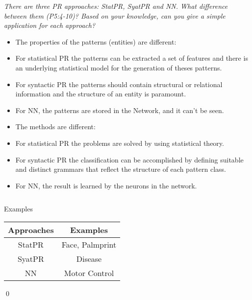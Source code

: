 \documentclass[
        ]{beamer}
\begin{document}
    		\begin{frame}[c]{\subsecname}
    			\begin{overprint}
    			\emph{There are three PR approaches: StatPR, SyatPR and NN. What difference between them (P5:4-10)? Based on your knowledge, can you give a simple application for each approach?}
    				\onslide<2>  %
    				\onslide<3>  %
    				\onslide<4>  %
    				\onslide<5>  %
    				\onslide<6>  %
    				\onslide<7>  %
    				\onslide<8>  %
    				\onslide<9>
    					\begin{itemize}
    						\item
The properties of the patterns (entities) are different: 
								\item
For statistical PR the patterns can be extracted a set of features and there is an underlying statistical model for the generation of theses patterns.
								\item
For syntactic PR the patterns should contain structural or relational information and the structure of an entity is paramount. 
								\item
For NN, the patterns are stored in the Network, and it can't be seen.
  						\end{itemize}
    					\begin{itemize}
								\item
The methods are different:
								\item
  For statistical PR the problems are solved by using statistical theory.
								\item
  For syntactic PR the classification can be accomplished by defining suitable and distinct grammars that reflect the structure of each pattern class.
								\item
  For NN, the result is learned by the neurons in the network.
  						\end{itemize}
    				 $\;$\\
    				\begin{center}
            Examples\\           
            \begin{tabular}{|c|c|}
                    \hline
                    Approaches & Examples        \\\hline
                    StatPR     & Face, Palmprint \\
                    SyatPR     & Disease    \\
                    NN         & Motor Control   \\\hline
            \end{tabular}
            \end{center}
            \qed
    			\end{overprint}
    		\end{frame}
\end{document}
